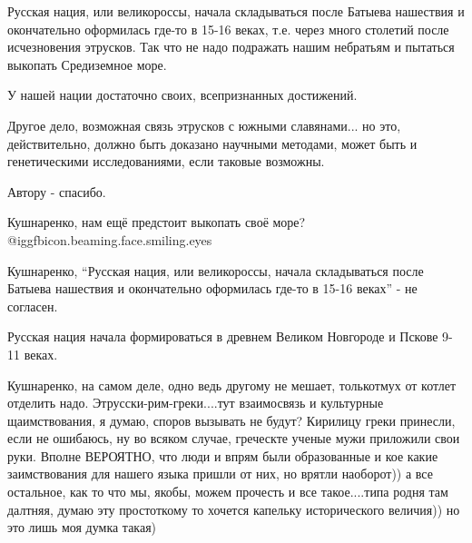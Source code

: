  
 
 
 
 
\zzSecCmt

\begin{itemize} %

Русская нация, или великороссы, начала складываться после Батыева нашествия и
окончательно оформилась где-то в 15-16 веках, т.е. через много столетий после
исчезновения этрусков. Так что не надо подражать нашим небратьям и пытаться
выкопать Средиземное море.

У нашей нации достаточно своих, всепризнанных достижений.

Другое дело, возможная связь этрусков с южными славянами... но это,
действительно, должно быть доказано научными методами, может быть и
генетическими исследованиями, если таковые возможны.

Автору - спасибо.

\begin{itemize} %

Кушнаренко, нам ещё предстоит выкопать своё море? @igg{fbicon.beaming.face.smiling.eyes} 

Кушнаренко, \enquote{Русская нация, или великороссы, начала складываться после Батыева
нашествия и окончательно оформилась где-то в 15-16 веках} - не согласен.

Русская нация начала формироваться в древнем Великом Новгороде и Пскове 9-11
веках.


Кушнаренко, на самом деле, одно ведь другому не мешает, толькотмух от котлет
отделить надо. Этрусски-рим-греки....тут взаимосвязь и культурные
щаимствования, я думаю, споров вызывать не будут? Кирилицу греки принесли, если
не ошибаюсь, ну во всяком случае, греческте ученые мужи приложили свои руки.
Вполне ВЕРОЯТНО, что люди и впрям были образованные и кое какие заимствования
для нашего языка пришли от них, но врятли наоборот)) а все остальное, как то
что мы, якобы, можем прочесть и все такое....типа родня там далтняя, думаю эту
простоткому то хочется капельку исторического величия)) но это лишь моя думка
такая)


\end{itemize}
\end{itemize}
